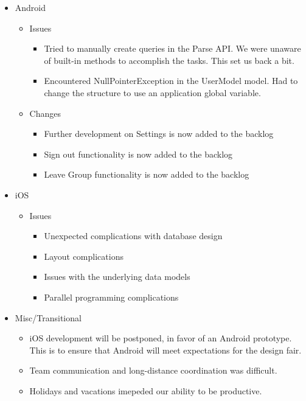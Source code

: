 \documentclass[11pt]{article}
\begin{document}
	\begin{itemize}
		\item Android
			\begin{itemize}
				\item Issues
				\begin{itemize}
					\item Tried to manually create queries in the Parse API. We were unaware of built-in methods to accomplish the tasks. This set us back a bit.
					\item Encountered NullPointerException in the UserModel model. Had to change the structure to use an application global variable.					
				\end{itemize}
				
				\item Changes
				\begin{itemize}
					\item Further development on Settings is now added to the backlog
					\item Sign out functionality is now added to the backlog
					\item Leave Group functionality is now added to the backlog			
				\end{itemize}
			\end{itemize}
		\item iOS
			\begin{itemize}
				\item Issues
				\begin{itemize}
					\item Unexpected complications with database design
					\item Layout complications
					\item Issues with the underlying data models
					\item Parallel programming complications
				\end{itemize}
			\end{itemize}
		
		\item Misc/Transitional
		\begin{itemize}
			\item iOS development will be postponed, in favor of an Android prototype. This is to ensure that Android will meet expectations for the design fair.
			\item Team communication and long-distance coordination was difficult.
			\item Holidays and vacations imepeded our ability to be productive.
		\end{itemize}
	\end{itemize}
\end{document}
